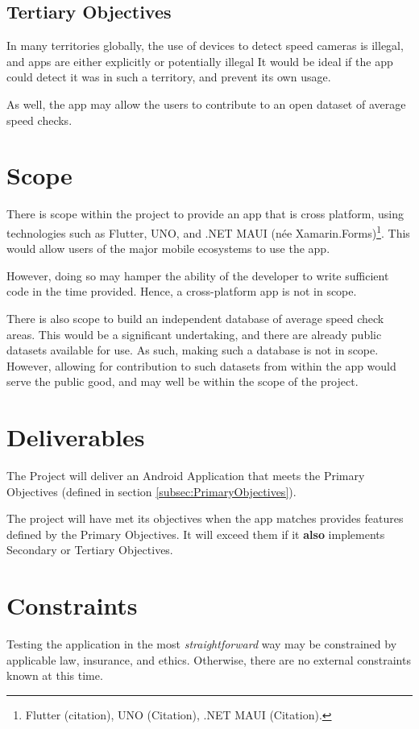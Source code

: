\documentclass[11pt, a4paper, notitlepage]{report}
\begin{document}
\subsection{Tertiary Objectives}
In many territories globally, the use of devices to detect speed cameras is 
illegal, and apps are either explicitly or potentially illegal %
It would be ideal if the app could detect it was in such a territory, and 
prevent its own usage.

As well, the app may allow the users to contribute to an open dataset of 
average speed checks.

\section{Scope}\label{sec:Scope}
There is scope within the project to provide an app that is cross platform, 
using technologies such as Flutter, UNO, and .NET MAUI (née 
Xamarin.Forms)\footnote{Flutter (citation), UNO (Citation), .NET MAUI 
(Citation).}. This would allow users of the major mobile ecosystems to use the 
app. 

However, doing so may hamper the ability of the developer to write 
sufficient code in the time provided. Hence, a cross-platform app is not in 
scope.

There is also scope to build an independent database of average speed check 
areas. This would be a significant undertaking, and there are already public 
datasets available for use. As such, making such a database is not in scope. 
However, allowing for contribution to such datasets from within the app would 
serve the public good, and may well be within the scope of the project.

\section{Deliverables}
The Project will deliver an Android Application that meets the Primary 
Objectives (defined in section \ref{subsec:PrimaryObjectives}).

The project will have met its objectives when the app matches provides features 
defined by the Primary Objectives. It will exceed them if it \textbf{also} 
implements Secondary or Tertiary Objectives.

\section{Constraints}
Testing the application in the most \textit{straightforward} way may be 
constrained by applicable law, insurance, and ethics. Otherwise, there are no 
external constraints known at this time.
\end{document}
